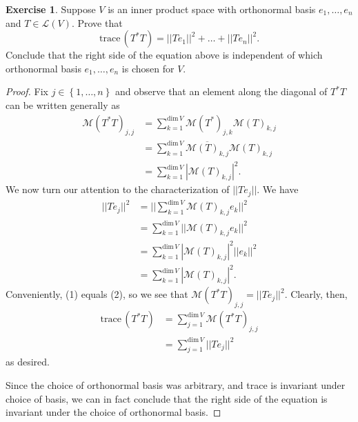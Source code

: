 \documentclass{article}
\theoremstyle{definition}
\newtheorem{ex}{Exercise}
\begin{document}
\begin{ex}
	Suppose $V$ is an inner product space with orthonormal basis $e_1, \dots, e_n$ and $T \in \mathcal{L}(V)$.
	Prove that \begin{equation*}
		\mathrm{trace}\,(T^*T) = ||Te_1||^2 + \dots + ||Te_n||^2.
	\end{equation*}
	Conclude that the right side of the equation above is independent of which orthonormal basis $e_1, \dots, e_n$ is chosen for $V$.
\end{ex}
\begin{proof}
	Fix $j \in \left\lbrace 1, \dots, n \right\rbrace$ and observe that an element along the diagonal of $T^*T$ can be written generally as \begin{align*}
		\mathcal{M}(T^*T)_{j, j} & = \sum _{k = 1}^{\mathrm{dim}\,V}\mathcal{M}(T^*)_{j, k}\mathcal{M}(T)_{k, j}          \\
		                         & = \sum _{k = 1}^{\mathrm{dim}\,V}\overline{\mathcal{M}(T)_{k, j}}\mathcal{M}(T)_{k, j} \\
		                         & = \sum _{k = 1}^{\mathrm{dim}\,V}|\mathcal{M}(T)_{k, j}|^2. \tag{1}
	\end{align*}
	We now turn our attention to the characterization of $||Te_j||$.
	We have \begin{align*}
		||Te_j||^2 & = ||\sum _{k = 1}^{\mathrm{dim}\,V} \mathcal{M}(T)_{k, j}e_k||^2     \\
		           & = \sum _{k = 1}^{\mathrm{dim}\,V} ||\mathcal{M}(T)_{k, j}e_k||^2     \\
		           & = \sum _{k = 1}^{\mathrm{dim}\,V} |\mathcal{M}(T)_{k, j}|^2||e_k||^2 \\
		           & = \sum _{k = 1}^{\mathrm{dim}\,V} |\mathcal{M}(T)_{k, j}|^2 \tag{2}.
	\end{align*}
	Conveniently, (1) equals (2), so we see that $\mathcal{M}(T^*T)_{j, j} = ||Te_j||^2$.
	Clearly, then, \begin{align*}
		\mathrm{trace}\,(T^*T) & = \sum _{j = 1}^{\mathrm{dim}\,V}\mathcal{M}(T^*T)_{j, j} \\
		                       & = \sum _{j = 1}^{\mathrm{dim}\,V}||Te_j||^2
	\end{align*}
	as desired.

	Since the choice of orthonormal basis was arbitrary, and trace is invariant under choice of basis, we can in fact conclude that the right side of the equation is invariant under the choice of orthonormal basis.
\end{proof}
\end{document}
